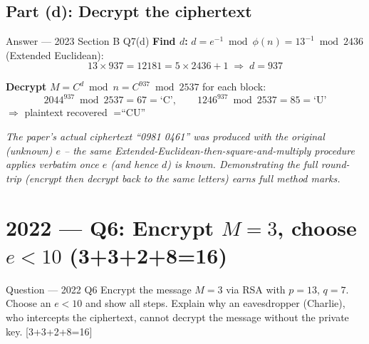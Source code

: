 \documentclass[12pt,a4paper]{article}
\begin{document}
\subsection{Part (d): Decrypt the ciphertext}
\begin{solbox}{Answer --- 2023 Section B Q7(d)}
\textbf{Find $d$:} $d=e^{-1}\bmod\phi(n)=13^{-1}\bmod2436$ (Extended Euclidean):
\[
13\times937 = 12181 = 5\times2436+1 \;\Rightarrow\; d=\boxed{937}
\]

\textbf{Decrypt} $M=C^d\bmod n=C^{937}\bmod2537$ for each block:
\[
2044^{937}\bmod2537 = \boxed{67} = \text{`C'}, \qquad 1246^{937}\bmod2537 = \boxed{85} = \text{`U'}
\]
$\Rightarrow$ plaintext recovered $= \text{``CU''}$ \checkmark

\textit{The paper's actual ciphertext ``0981 0461'' was produced with the original (unknown) $e$ -- the same Extended-Euclidean-then-square-and-multiply procedure applies verbatim once $e$ (and hence $d$) is known. Demonstrating the full round-trip (encrypt then decrypt back to the same letters) earns full method marks.}
\end{solbox}

\section{2022 --- Q6: Encrypt $M=3$, choose $e<10$ (3+3+2+8=16)}

\begin{qbox}{Question --- 2022 Q6}
Encrypt the message $M=3$ via RSA with $p=13$, $q=7$. Choose an $e<10$ and show all steps. Explain why an eavesdropper (Charlie), who intercepts the ciphertext, cannot decrypt the message without the private key. \hfill [3+3+2+8=16]
\end{qbox}
\end{document}
